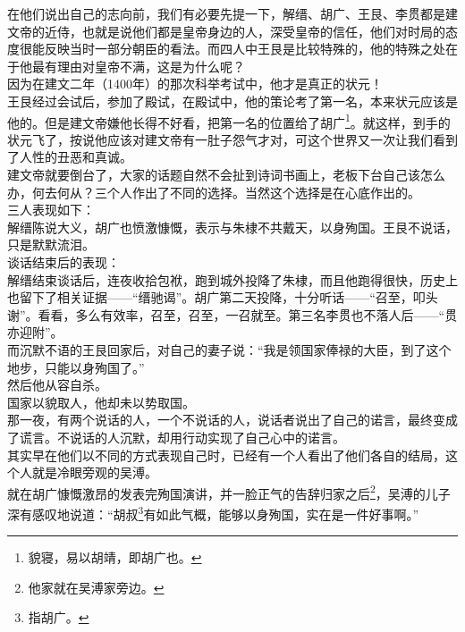 \begin{multicols}{\theparacolNo}
在他们说出自己的志向前，我们有必要先提一下，解缙、胡广、王艮、李贯都是建文帝的近侍，也就是说他们都是皇帝身边的人，深受皇帝的信任，他们对时局的态度很能反映当时一部分朝臣的看法。而四人中王艮是比较特殊的，他的特殊之处在于他最有理由对皇帝不满，这是为什么呢？\\

因为在建文二年（1400年）的那次科举考试中，他才是真正的状元！\\

王艮经过会试后，参加了殿试，在殿试中，他的策论考了第一名，本来状元应该是他的。但是建文帝嫌他长得不好看，把第一名的位置给了胡广\footnote{貌寝，易以胡靖，即胡广也。}。就这样，到手的状元飞了，按说他应该对建文帝有一肚子怨气才对，可这个世界又一次让我们看到了人性的丑恶和真诚。\\

建文帝就要倒台了，大家的话题自然不会扯到诗词书画上，老板下台自己该怎么办，何去何从？三个人作出了不同的选择。当然这个选择是在心底作出的。\\

三人表现如下：\\

解缙陈说大义，胡广也愤激慷慨，表示与朱棣不共戴天，以身殉国。王艮不说话，只是默默流泪。\\

谈话结束后的表现：\\

解缙结束谈话后，连夜收拾包袱，跑到城外投降了朱棣，而且他跑得很快，历史上也留下了相关证据——“缙驰谒”。胡广第二天投降，十分听话——“召至，叩头谢”。看看，多么有效率，召至，召至，一召就至。第三名李贯也不落人后——“贯亦迎附”。\\

而沉默不语的王艮回家后，对自己的妻子说：“我是领国家俸禄的大臣，到了这个地步，只能以身殉国了。”\\

然后他从容自杀。\\

国家以貌取人，他却未以势取国。\\

那一夜，有两个说话的人，一个不说话的人，说话者说出了自己的诺言，最终变成了谎言。不说话的人沉默，却用行动实现了自己心中的诺言。\\

其实早在他们以不同的方式表现自己时，已经有一个人看出了他们各自的结局，这个人就是冷眼旁观的吴溥。\\

就在胡广慷慨激昂的发表完殉国演讲，并一脸正气的告辞归家之后\footnote{他家就在吴溥家旁边。}，吴溥的儿子深有感叹地说道：“胡叔\footnote{指胡广。}有如此气概，能够以身殉国，实在是一件好事啊。”\\


\end{multicols}
